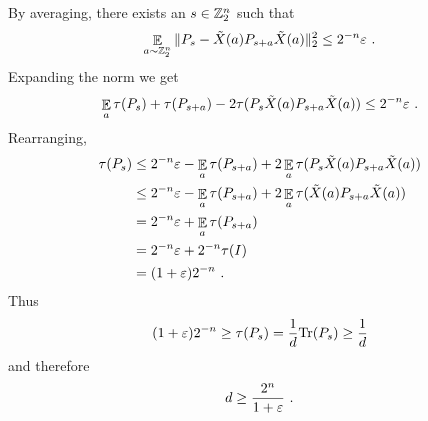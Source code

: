 By averaging, there exists an $s \in \mathbb{Z}_2^n$ such that
\[
\mathop{\mathbb{E}}\displaylimits_{a \sim \mathbb{Z}_2^n} \| P_s - \tilde{X}(a) P_{s+a} \tilde{X}(a) \|_2^2 \leq 2^{-n} \varepsilon~.
\]
Expanding the norm we get
\[
\mathop{\mathbb{E}}\displaylimits_a \tau(P_s) + \tau(P_{s+a}) - 2\tau(P_s \tilde{X}(a) P_{s+a} \tilde{X}(a)) \leq 2^{-n} \varepsilon~.
\]
Rearranging,
\begin{align*}
\tau(P_s) &\leq 2^{-n} \varepsilon - \mathop{\mathbb{E}}\displaylimits_a \tau(P_{s+a}) + 2 \mathop{\mathbb{E}}\displaylimits_a \tau(P_s \tilde{X}(a) P_{s+a} \tilde{X}(a))  \\
&\leq 2^{-n} \varepsilon - \mathop{\mathbb{E}}\displaylimits_a \tau(P_{s+a}) + 2 \mathop{\mathbb{E}}\displaylimits_a \tau(\tilde{X}(a) P_{s+a} \tilde{X}(a)) \\
&= 2^{-n} \varepsilon + \mathop{\mathbb{E}}\displaylimits_a \tau(P_{s+a}) \\
&= 2^{-n} \varepsilon + 2^{-n} \tau(I) \\
&= (1 + \varepsilon)2^{-n}~.
\end{align*}
Thus 
\[
(1 + \varepsilon)2^{-n} \geq \tau(P_s) = \frac{1}{d} \mbox{\rm Tr}(P_s) \geq \frac{1}{d}
\]
and therefore
\[
    d \geq \frac{2^n}{1 + \varepsilon}~.
\]

